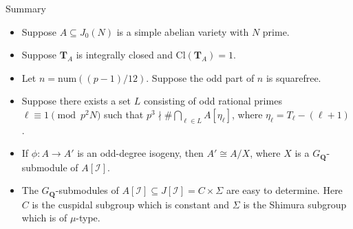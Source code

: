 \documentclass{beamer}
\newcommand{\QQ}{\mathbf{Q}}
\newcommand{\TT}{\mathbf{T}}
\newcommand{\I}{\mathcal{I}}
\newcommand{\num}{\mathrm{num}}
\newcommand{\Cl}{\mathrm{Cl}}
\begin{document}
\begin{frame}{Summary}
    \begin{itemize}
        \item 
            Suppose $A\subseteq J_0(N)$ is a simple abelian variety with $N$ prime.
            \pause
        \item
            Suppose $\TT_A$ is integrally closed and $\Cl(\TT_A)=1$.
            \pause
        \item
            Let $n=\num((p-1)/12)$. Suppose the odd part of $n$ is squarefree.
            \pause
        \item
            Suppose there exists a set $L$ consisting of odd rational primes
            $\ell\equiv 1 \pmod{p^2 N}$ such that $p^3\nmid \#\bigcap_{\ell\in L}
            A[\eta_\ell]$, where $\eta_\ell=T_\ell-(\ell+1)$.
            \pause
        \item
            If $\phi:A\to A'$ is an odd-degree isogeny, then $A'\cong A/X$,
            where $X$ is a $G_\QQ$-submodule of $A[\mathcal{I}]$.
            \pause
        \item
            The $G_\QQ$-submodules of $A[\mathcal{I}]\subseteq J[\I]=C\times
            \Sigma$ are easy to determine. Here $C$ is the cuspidal subgroup
            which is constant and $\Sigma$ is the Shimura subgroup which is of
            $\mu$-type.
    \end{itemize}
\end{frame}
\end{document}
